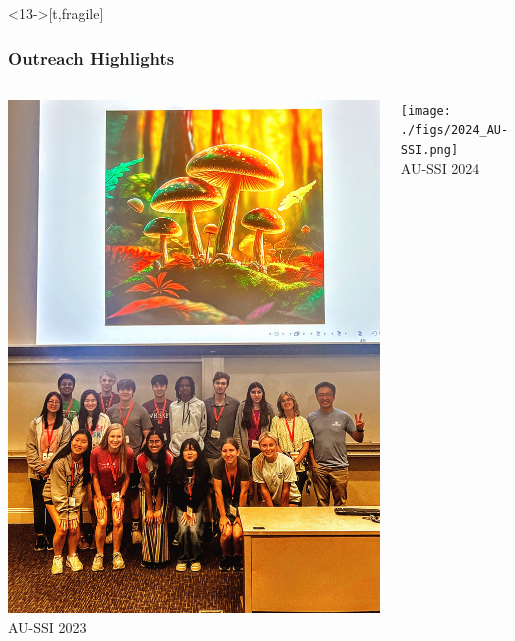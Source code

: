 \documentclass[9pt,table,xcolor=dvipsnames]{beamer}
\begin{document}
\begin{frame}<13->[t,fragile] %
  \frametitle{Outreach Highlights}

  \begin{columns}[T,onlytextwidth]
    \centering
    \includegraphics[height=0.78\textheight,keepaspectratio]{./figs/2023_AU-SSI_Full.JPG}\\[0.3em]
    {\footnotesize AU-SSI 2023}

    \centering
    \texttt{[image: ./figs/2024\_AU-SSI.png]}\\[0.3em]
    {\footnotesize AU-SSI 2024}

    \medskip


\end{columns}
\end{frame}
\end{document}
